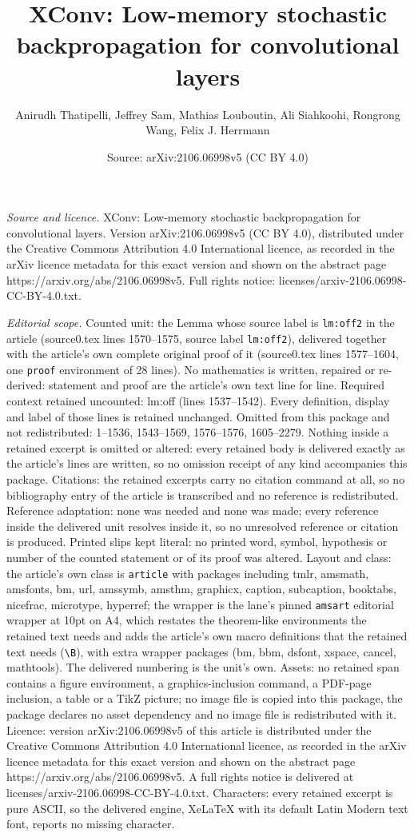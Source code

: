 \documentclass[10pt,a4paper]{amsart}
\title[XConv: Low-memory stochastic backpropagation for convolution]{XConv: Low-memory stochastic backpropagation for convolutional layers}
\author{Anirudh Thatipelli, Jeffrey Sam, Mathias Louboutin, Ali Siahkoohi, Rongrong Wang, Felix J. Herrmann}
\date{Source: arXiv:2106.06998v5 (CC BY 4.0)}
\begin{document}
\maketitle

\noindent\emph{Source and licence.} XConv: Low-memory stochastic backpropagation for convolutional layers. Version arXiv:2106.06998v5 (CC BY 4.0), distributed under the Creative Commons Attribution 4.0 International licence, as recorded in the arXiv licence metadata for this exact version and shown on the abstract page https://arxiv.org/abs/2106.06998v5. Full rights notice: licenses/arxiv-2106.06998-CC-BY-4.0.txt.\par\smallskip

\noindent\textit{Editorial scope.} Counted unit: the Lemma whose source label is \texttt{lm:off2} in the article (source0.tex lines 1570--1575, source label \texttt{lm:off2}), delivered together with the article's own complete original proof of it (source0.tex lines 1577--1604, one \texttt{proof} environment of 28 lines). No mathematics is written, repaired or re-derived: statement and proof are the article's own text line for line. Required context retained uncounted: lm:off (lines 1537--1542). Every definition, display and label of those lines is retained unchanged. Omitted from this package and not redistributed: 1--1536, 1543--1569, 1576--1576, 1605--2279. Nothing inside a retained excerpt is omitted or altered: every retained body is delivered exactly as the article's lines are written, so no omission receipt of any kind accompanies this package. Citations: the retained excerpts carry no citation command at all, so no bibliography entry of the article is transcribed and no reference is redistributed. Reference adaptation: none was needed and none was made; every reference inside the delivered unit resolves inside it, so no unresolved reference or citation is produced. Printed slips kept literal: no printed word, symbol, hypothesis or number of the counted statement or of its proof was altered. Layout and class: the article's own class is \texttt{article} with packages including tmlr, amsmath, amsfonts, bm, url, amssymb, amsthm, graphicx, caption, subcaption, booktabs, nicefrac, microtype, hyperref; the wrapper is the lane's pinned \texttt{amsart} editorial wrapper at 10pt on A4, which restates the theorem-like environments the retained text needs and adds the article's own macro definitions that the retained text needs (\texttt{\textbackslash B}), with extra wrapper packages (bm, bbm, dsfont, xspace, cancel, mathtools). The delivered numbering is the unit's own. Assets: no retained span contains a figure environment, a graphics-inclusion command, a PDF-page inclusion, a table or a TikZ picture; no image file is copied into this package, the package declares no asset dependency and no image file is redistributed with it. Licence: version arXiv:2106.06998v5 of this article is distributed under the Creative Commons Attribution 4.0 International licence, as recorded in the arXiv licence metadata for this exact version and shown on the abstract page https://arxiv.org/abs/2106.06998v5. A full rights notice is delivered at licenses/arxiv-2106.06998-CC-BY-4.0.txt. Characters: every retained excerpt is pure ASCII, so the delivered engine, XeLaTeX with its default Latin Modern text font, reports no missing character.
\end{document}
